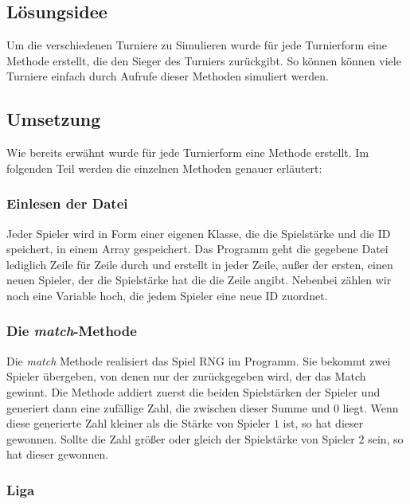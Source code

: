 \documentclass[a4paper, 12pt]{scrartcl}
\begin{document}
\subsection{Lösungsidee}

Um die verschiedenen Turniere zu Simulieren wurde  für jede Turnierform eine Methode erstellt, die den Sieger des Turniers zurückgibt. So können können viele Turniere einfach durch Aufrufe dieser Methoden simuliert werden.

\subsection{Umsetzung}

Wie bereits erwähnt wurde für jede Turnierform eine Methode erstellt. Im folgenden Teil werden die einzelnen Methoden genauer erläutert:

\subsubsection{Einlesen der Datei}

Jeder Spieler wird in Form einer eigenen Klasse, die die Spielstärke und die ID speichert, in einem Array gespeichert. Das Programm geht die gegebene Datei lediglich Zeile für Zeile durch und erstellt in jeder Zeile, außer der ersten, einen neuen Spieler, der die Spielstärke hat die die Zeile angibt. Nebenbei zählen wir noch eine Variable hoch, die jedem Spieler eine neue ID zuordnet.

\subsubsection{Die \emph{match}-Methode}

Die \emph{match} Methode realisiert das Spiel RNG im Programm. Sie bekommt zwei Spieler übergeben, von denen nur der
zurückgegeben wird, der das Match gewinnt. Die Methode addiert zuerst die
beiden Spielstärken der Spieler und generiert dann eine zufällige Zahl, die
zwischen dieser Summe und $0$ liegt. Wenn diese generierte Zahl kleiner als die
Stärke von Spieler $1$ ist, so hat dieser gewonnen. Sollte die Zahl größer oder
gleich der Spielstärke von Spieler $2$ sein, so hat dieser gewonnen.

\subsubsection{Liga}
\end{document}
